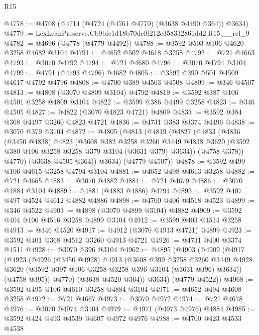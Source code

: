 \begin{lexlean}{R15}
\begin{coremodule}
@4778 := @4708 (@4714 (@4724 (@4761 @4770) (@3638 @4490 @364)) @3634)
@4779 := LexLeanPreserve.Cb9bfc1d18b70def0212e358332861dd2.R15.__rel_9
@4782 := @4696 (@4778 (@4779 @4492))
@4788 := @3592 @503 @106 @4620 @3258 @4682 @3104
@4791 := @4652 @502 @4618 @3258
@4792 := @721 @4663
@4793 := @3070 @4792
@4794 := @721 @4680
@4796 := @3070 @4794 @3104
@4799 := @4791 (@4793 @4796) @4682
@4805 := @3592 @390 @501 @4509 @4617 @4792 @4796
@4808 := @4700 @389 @4503 @4508
@4809 := @346 @4507
@4813 := @4808 (@3070 @4809 @3104) @4792
@4819 := @3592 @387 @106 @4501 @3258 @4809 @3104
@4822 := @3599 @386 @4499 @3258
@4823 := @346 @4505
@4827 := @4822 (@3070 @4823 @4721) @4809
@4833 := @3592 @384 @368 @4497 @3260 @4823 @4721
@4836 := @4731 @383 @3374 @4496
@4838 := @3070 @379 @3104
@4872 := @4805
    (@4813
      (@4819
        (@4827
          (@4833
            (@4836
              (@3450 @4838)
              @4823
              (@3608
                @382
                @3258
                @3260
                @3449
                @4838
                @3620
                (@3592 @380 @106 @3258 @3258 @379 @3104 (@3631 @379) @3634))
              (@4758 @378))
            @4770)
          (@3638 @4505 @364))
        @3634)
      (@4779 @4507))
@4878 := @3592 @499 @106 @4615 @3258 @4794 @3104
@4881 := @4652 @498 @4613 @3258
@4882 := @721 @4665
@4883 := @3070 @4882
@4884 := @721 @4679
@4886 := @3070 @4884 @3104
@4889 := @4881 (@4883 @4886) @4794
@4895 := @3592 @407 @497 @4524 @4612 @4882 @4886
@4898 := @4700 @406 @4518 @4523
@4899 := @346 @4522
@4903 := @4898 (@3070 @4899 @3104) @4882
@4909 := @3592 @404 @106 @4516 @3258 @4899 @3104
@4912 := @3599 @403 @4514 @3258
@4913 := @346 @4520
@4917 := @4912 (@3070 @4913 @4721) @4899
@4923 := @3592 @401 @368 @4512 @3260 @4913 @4721
@4926 := @4731 @400 @3374 @4511
@4928 := @3070 @396 @3104
@4962 := @4895
    (@4903
      (@4909
        (@4917
          (@4923
            (@4926
              (@3450 @4928)
              @4913
              (@3608
                @399
                @3258
                @3260
                @3449
                @4928
                @3620
                (@3592 @397 @106 @3258 @3258 @396 @3104 (@3631 @396) @3634))
              (@4758 @395))
            @4770)
          (@3638 @4520 @364))
        @3634)
      (@4779 @4522))
@4968 := @3592 @495 @106 @4610 @3258 @4884 @3104
@4971 := @4652 @494 @4608 @3258
@4972 := @721 @4667
@4973 := @3070 @4972
@4974 := @721 @4678
@4976 := @3070 @4974 @3104
@4979 := @4971 (@4973 @4976) @4884
@4985 := @3592 @424 @493 @4539 @4607 @4972 @4976
@4988 := @4700 @423 @4533 @4538

\end{coremodule}
\end{lexlean}
